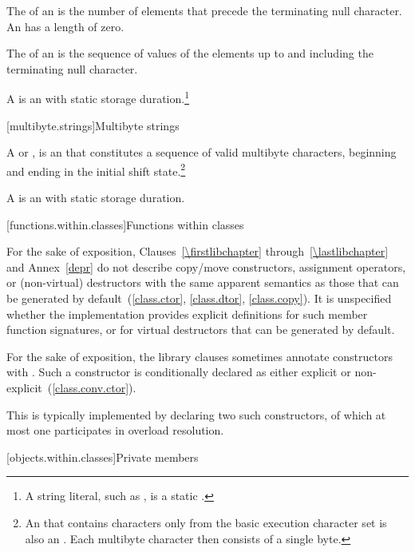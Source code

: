 \pnum
The
 of an \ntbs
is the number of elements that
precede the terminating null character.
%
An
 \ntbs
has a length of zero.

\pnum
The
 of an \ntbs
is the sequence of values of the
elements up to and including the terminating null character.
%

\pnum
A
%
%
 \ntbs
is an \ntbs with
static storage duration.\footnote{A string literal, such as
,
is a static \ntbs.}

[multibyte.strings]{Multibyte strings}

\pnum
A
%
%
or \ntmbs,
%
is an \ntbs that constitutes a
sequence of valid multibyte characters, beginning and ending in the initial
shift state.\footnote{An \ntbs that contains characters only from the
basic execution character set is also an \ntmbs.
Each multibyte character then
consists of a single byte.}

\pnum
A
 \ntmbs
is an \ntmbs with static storage duration.
%
%

[functions.within.classes]{Functions within classes}

\pnum
For the sake of exposition, Clauses~\ref{\firstlibchapter} through~\ref{\lastlibchapter}
and Annex~\ref{depr} do not describe copy/move constructors, assignment
operators, or (non-virtual) destructors with the same apparent
semantics as those that can be generated by default~(\ref{class.ctor}, \ref{class.dtor}, \ref{class.copy}).
%
%
%
It is unspecified whether
the implementation provides explicit definitions for such member function
signatures, or for virtual destructors that can be generated by default.

\pnum
For the sake of exposition, the library clauses sometimes annotate
constructors with \EXPLICIT{}. Such a constructor is conditionally declared
as either explicit or non-explicit~(\ref{class.conv.ctor}).
\begin{note} This is typically implemented by declaring two such constructors,
of which at most one participates in overload resolution. \end{note}

[objects.within.classes]{Private members}

